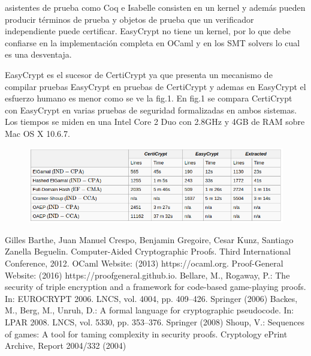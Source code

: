 \documentclass[runningheads]{llncs}
\begin{document}
asistentes de prueba como Coq e Isabelle consisten en un kernel y además pueden producir términos de prueba y objetos de prueba que un verificador independiente puede certificar. EasyCrypt no tiene un kernel, por lo que debe confiarse en la implementación completa en OCaml y en los SMT solvers lo cual es una desventaja.

EasyCrypt es el sucesor de CertiCrypt ya que presenta un mecanismo de compilar pruebas EasyCrypt en pruebas de CertiCrypt y ademas en EasyCrypt el esfuerzo humano es menor como se ve la fig.1. En fig.1 se compara CertiCrypt con EasyCrypt en varias pruebas de seguridad formalizadas en ambos sistemas. Los tiempos se miden en una Intel Core 2 Duo con 2.8GHz y 4GB de RAM sobre Mac OS X 10.6.7.
\begin{figure}
  \centering
  \includegraphics[width=.8\textwidth]{tabla_1}
  \caption{}
  \label{fig:simple}
\end{figure}
\begin{thebibliography}{8}
Gilles Barthe, Juan Manuel Crespo, Benjamin Gregoire, Cesar Kunz, Santiago Zanella Beguelin. Computer-Aided Cryptographic Proofs. Third International Conference, 2012.
OCaml Website: (2013) https://ocaml.org.
Proof-General Website: (2016) https://proofgeneral.github.io.
Bellare, M., Rogaway, P.: The security of triple encryption and a framework for
code-based game-playing proofs. In: EUROCRYPT 2006. LNCS, vol. 4004, pp.
409–426. Springer (2006)
Backes, M., Berg, M., Unruh, D.: A formal language for cryptographic pseudocode.
In: LPAR 2008. LNCS, vol. 5330, pp. 353–376. Springer (2008)
Shoup, V.: Sequences of games: A tool for taming complexity in security proofs.
Cryptology ePrint Archive, Report 2004/332 (2004)

\end{thebibliography}
\end{document}
